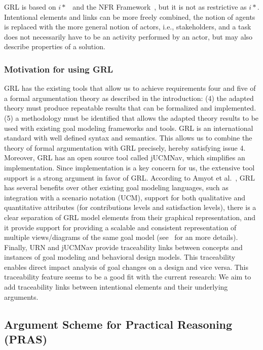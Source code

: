 \documentclass[11.5pt,two column]{llncs}
\begin{document}
GRL is based on $i*$~\cite{Yu:1997:TMR:827255.827807} and the NFR Framework~\cite{chung2012non}, but it is not as restrictive as $i*$. Intentional elements and links can be more freely combined, the notion of agents is replaced with the more general notion of actors, i.e., stakeholders, and a task does not necessarily have to be an activity performed by an actor, but may also describe properties of a solution.

\subsubsection{Motivation for using GRL}
\label{sect:background:grl:motivation}

GRL has the existing tools that allow us to achieve requirements four and five of a formal argumentation theory as described in the introduction: (4) the adapted theory must produce repeatable results that can be formalized and implemented. (5) a methodology must be identified that allows the adapted theory results to be used with existing goal modeling frameworks and tools. GRL is an international standard with well defined syntax and semantics. This allows us to combine the theory of formal argumentation with GRL precisely, hereby satisfying issue 4. Moreover, GRL has an open source tool called jUCMNav, which simplifies an implementation. Since implementation is a key concern for us, the extensive tool support is a strong argument in favor of GRL.  According to Amyot et al.~\cite{amyot2009lightweight}, GRL has several benefits over other existing goal modeling languages, such as integration with a scenario notation (UCM), support for both qualitative and quantitative attributes (for contributions levels and satisfaction levels), there is a clear separation of GRL model elements from their graphical representation, and it provide support for providing a scalable and consistent representation of multiple views/diagrams of the same goal model (see~\cite[Ch.2]{Ghanavati2013} for an more details). Finally, URN and jUCMNav provide traceability links between concepts and instances of goal modeling and behavioral design models. This traceability enables direct impact analysis of goal changes on a design and vice versa. This traceability feature seems to be a good fit with the current research: We aim to add traceability links between intentional elements and their underlying arguments. %

\subsection{Argument Scheme for Practical Reasoning (PRAS)} %
\label{sect:background:pras}
\end{document}
